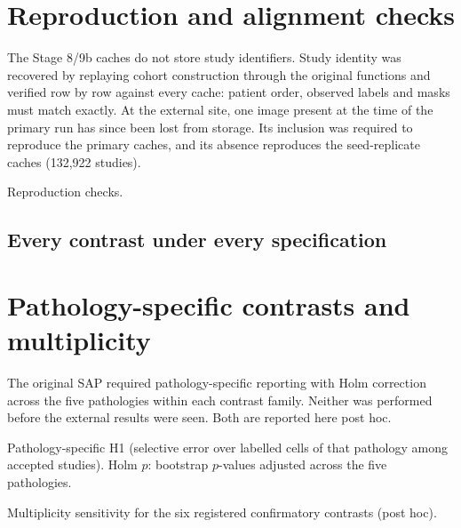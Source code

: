 \documentclass[10pt,a4paper]{article}
\begin{document}
\section{Reproduction and alignment checks}
The Stage 8/9b caches do not store study identifiers. Study identity was
recovered by replaying cohort construction through the original functions and
verified row by row against every cache: patient order, observed labels and
masks must match exactly. At the external site, one image present at the time
of the primary run has since been lost from storage. Its inclusion was required
to reproduce the primary caches, and its absence reproduces the seed-replicate
caches (132,922 studies).
\begin{table}[h]\centering\small
\caption{Reproduction checks.}\label{tab:repro}

\end{table}

\begin{landscape}
\section{Every contrast under every specification}
\footnotesize

\normalsize
\end{landscape}

\section{Pathology-specific contrasts and multiplicity}
The original SAP required pathology-specific reporting with Holm correction
across the five pathologies within each contrast family. Neither was performed
before the external results were seen. Both are reported here post hoc.
\begin{table}[h]\centering\small
\caption{Pathology-specific H1 (selective error over labelled cells of that
pathology among accepted studies). Holm $p$: bootstrap $p$-values adjusted
across the five pathologies.}
\begin{adjustbox}{max width=\linewidth}\end{adjustbox}
\end{table}
\begin{table}[h]\centering\small
\caption{Multiplicity sensitivity for the six registered confirmatory contrasts
(post hoc).}
\begin{adjustbox}{max width=\linewidth}\end{adjustbox}
\end{table}
\end{document}
